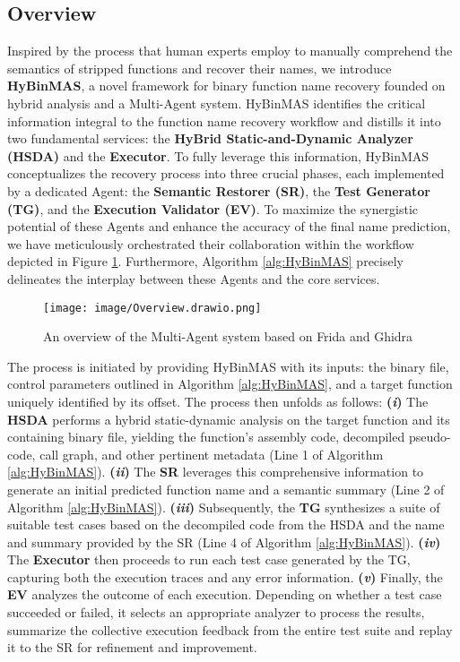 \documentclass[acmsmall,screen,review,anonymous]{acmart} %
\begin{document}
\subsection{Overview}
Inspired by the process that human experts employ to manually comprehend the semantics of stripped functions and recover their names, we introduce \textbf{HyBinMAS}, a novel framework for binary function name recovery founded on hybrid analysis and a Multi-Agent system. HyBinMAS identifies the critical information integral to the function name recovery workflow and distills it into two fundamental services: the \textbf{HyBrid Static-and-Dynamic Analyzer (HSDA)} and the \textbf{Executor}. To fully leverage this information, HyBinMAS conceptualizes the recovery process into three crucial phases, each implemented by a dedicated Agent: the \textbf{Semantic Restorer (SR)}, the \textbf{Test Generator (TG)}, and the \textbf{Execution Validator (EV)}. To maximize the synergistic potential of these Agents and enhance the accuracy of the final name prediction, we have meticulously orchestrated their collaboration within the workflow depicted in Figure \ref{fig:overview}. Furthermore, Algorithm \ref{alg:HyBinMAS} precisely delineates the interplay between these Agents and the core services.
\begin{figure}[h] %
    \centering
    \texttt{[image: image/Overview.drawio.png]} %
    \caption{An overview of the Multi-Agent system based on Frida and Ghidra} %
    \label{fig:overview} %
\end{figure}

The process is initiated by providing HyBinMAS with its inputs: the binary file, control parameters outlined in Algorithm \ref{alg:HyBinMAS}, and a target function uniquely identified by its offset. The process then unfolds as follows: \textbf{(\textit{i})} The \textbf{HSDA} performs a hybrid static-dynamic analysis on the target function and its containing binary file, yielding the function's assembly code, decompiled pseudo-code, call graph, and other pertinent metadata (Line 1 of Algorithm \ref{alg:HyBinMAS}). \textbf{(\textit{ii})} The \textbf{SR} leverages this comprehensive information to generate an initial predicted function name and a semantic summary (Line 2 of Algorithm \ref{alg:HyBinMAS}). \textbf{(\textit{iii})} Subsequently, the \textbf{TG} synthesizes a suite of suitable test cases based on the decompiled code from the HSDA and the name and summary provided by the SR (Line 4 of Algorithm \ref{alg:HyBinMAS}). \textbf{(\textit{iv})} The \textbf{Executor} then proceeds to run each test case generated by the TG, capturing both the execution traces and any error information. \textbf{(\textit{v})} Finally, the \textbf{EV} analyzes the outcome of each execution. Depending on whether a test case succeeded or failed, it selects an appropriate analyzer to process the results, summarize the collective execution feedback from the entire test suite and replay it to the SR for refinement and improvement.
\end{document}
